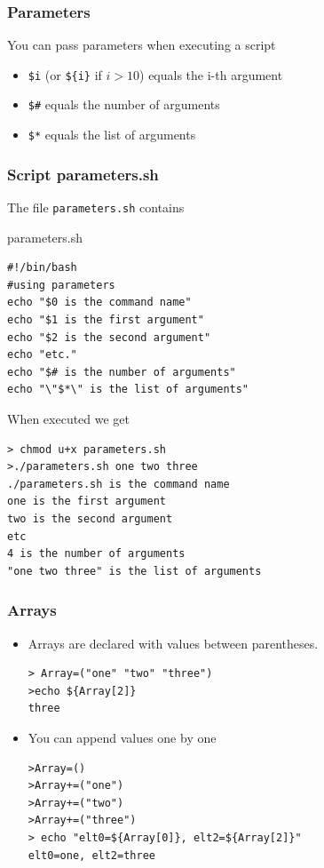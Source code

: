 \documentclass{beamer}
\newenvironment{terminal}{\color{white}\begin{snugshade*}}
{\end{snugshade*}\color{black}}
\begin{document}
\begin{frame}[fragile]
\frametitle{Parameters}
You can pass parameters when executing a script
\begin{itemize}
\item \verb|$i| (or \verb|${i}| if $i > 10$) equals the i-th argument
\item \verb|$#| equals the number of arguments
\item \verb|$*| equals the list of arguments
\end{itemize}
\end{frame}

\begin{frame}[fragile]
\frametitle{Script parameters.sh}
The file \verb|parameters.sh| contains
\begin{scriptsize}
\begin{block}{parameters.sh}
\begin{verbatim}
#!/bin/bash
#using parameters
echo "$0 is the command name"
echo "$1 is the first argument"
echo "$2 is the second argument"
echo "etc."
echo "$# is the number of arguments"
echo "\"$*\" is the list of arguments"
\end{verbatim}
\end{block}
\end{scriptsize}

When executed we get
\begin{scriptsize}
\begin{terminal}
\begin{verbatim}
> chmod u+x parameters.sh
>./parameters.sh one two three
./parameters.sh is the command name
one is the first argument
two is the second argument
etc
4 is the number of arguments
"one two three" is the list of arguments
\end{verbatim}
\end{terminal}
\end{scriptsize}
\end{frame}



\begin{frame}[fragile]
  \frametitle{Arrays}
  \begin{itemize}
  \item  Arrays are declared with values between parentheses.
  \begin{terminal}
\begin{verbatim}
> Array=("one" "two" "three")
>echo ${Array[2]}
three
\end{verbatim}
\end{terminal}
\item You can append values one by one
  \begin{terminal}
\begin{verbatim}
>Array=()
>Array+=("one")
>Array+=("two")
>Array+=("three")
> echo "elt0=${Array[0]}, elt2=${Array[2]}"
elt0=one, elt2=three
\end{verbatim}
\end{terminal}
\end{itemize}
\end{frame}
\end{document}
